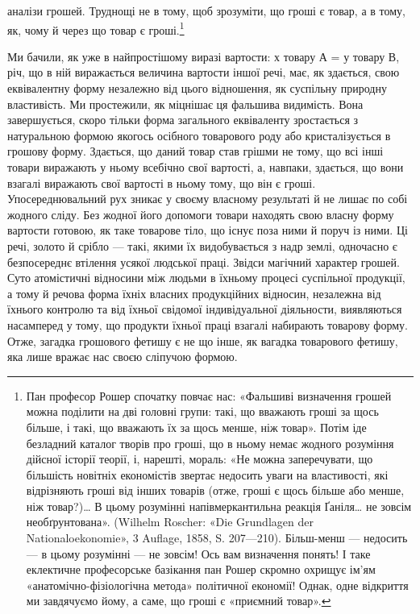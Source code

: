 \parcont{}  %
аналізи грошей. Труднощі не в тому, щоб зрозуміти, що гроші
є товар, а в тому, як, чому й через що товар є гроші.\footnote{
Пан професор Рошер спочатку повчає нас: «Фальшиві визначення
грошей можна поділити на дві головні групи: такі, що вважають гроші
за щось більше, і такі, що вважають їх за щось менше, ніж товар». Потім
іде безладний каталог творів про гроші, що в ньому немає жодного
розуміння дійсної історії теорії, і, нарешті, мораль: «Не можна заперечувати,
що більшість новітніх економістів звертає недосить уваги
на властивості, які відрізняють гроші від інших товарів (отже, гроші є
щось більше або менше, ніж товар?)\dots{} В цьому розумінні напівмеркантильна
реакція Ґаніля\dots{} не зовсім необґрунтована». (Wilhelm Roscher:
«Die Grundlagen der Nationaloekonomie», 3 Auflage, 1858, S. 207—210).
Більш-менш — недосить — в цьому розумінні — не зовсім! Ось вам визначення
понять! І таке еклектичне професорське базікання пан Рошер
скромно охрищує ім’ям «анатомічно-фізіологічна метода» політичної
економії! Однак, одне відкриття ми завдячуємо йому, а саме, що гроші
є «приємний товар».
}

Ми бачили, як уже в найпростішому виразі вартости: х товару
А = у товару В, річ, що в ній виражається величина вартости
іншої речі, має, як здається, свою еквівалентну форму незалежно
від цього відношення, як суспільну природну властивість. Ми
простежили, як міцнішає ця фальшива видимість. Вона завершується,
скоро тільки форма загального еквіваленту зростається
з натуральною формою якогось осібного товарового роду або
кристалізується в грошову форму. Здається, що даний товар став
грішми не тому, що всі інші товари виражають у ньому всебічно
свої вартості, а, навпаки, здається, що вони взагалі виражають
свої вартості в ньому тому, що він є гроші. Упосереднювальний
рух зникає у своєму власному результаті й не лишає по собі
жодного сліду. Без жодної його допомоги товари находять свою
власну форму вартости готовою, як таке товарове тіло, що існує
поза ними й поруч із ними. Ці речі, золото й срібло — такі,
якими їх видобувається з надр землі, одночасно є безпосереднє
втілення усякої людської праці. Звідси магічний характер грошей.
Суто атомістичні відносини між людьми в їхньому процесі
суспільної продукції, а тому й речова форма їхніх власних продукційних
відносин, незалежна від їхнього контролю та від
їхньої свідомої індивідуальної діяльности, виявляються насамперед
у тому, що продукти їхньої праці взагалі набирають товарову
форму. Отже, загадка грошового фетишу є не що інше, як
вагадка товарового фетишу, яка лише вражає нас своєю сліпучою
формою.

